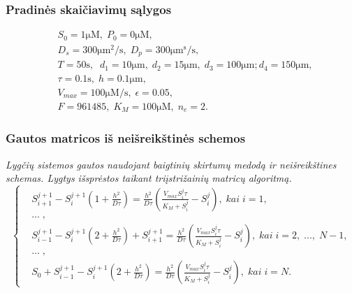 \documentclass[12pt, a4paper, lithuanian]{article}
\begin{document}
\subsubsection{Pradinės skaičiavimų sąlygos}

\begin{equation}
\begin{aligned}
    &S_0 = 1 \mathrm{\mu M},\; P_0 = 0 \mathrm{\mu M},\\
    &D_s = 300 \mathrm{\mu m^2/s},\; D_p = 300 \mathrm{\mu m^s/s},\\
    &T = 50\mathrm{s},\;\; d_1 = 10 \mathrm{\mu m},\; d_2 = 15\mathrm{\mu m},\; d_3 = 100\mathrm{\mu m}; d_4 =
    150\mathrm{\mu m},\\
    &\tau = 0.1\mathrm{s},\; h=0.1 \mathrm{\mu m},\\
    &V_{max} = 100\mathrm{\mu M /s},\; \epsilon = 0.05,\\
    &F=961485,\; K_M= 100\mathrm{\mu M},\; n_e = 2.
\end{aligned}
\end{equation}

\subsubsection{Gautos matricos iš neišreikštinės schemos}
\textit{Lygčių sistemos gautos naudojant baigtinių skirtumų medodą ir neišreikštines schemas. Lygtys išsprėstos taikant triįstrižainių matricų algoritmą.}
\begin{equation}
\left\{
\begin{aligned}
    &S_{i+1}^{j+1}-S_i^{j+1}\left(1+\frac{h^2}{D\tau}\right)
= \frac{h^2}{D\tau} \left(\frac{V_{max}S_i^j\tau}{K_M+S_i^j}-S_i^j\right),\; kai \; i = 1,\\
    &\dots\;,\\
    &S_{i-1}^{j+1}-S_i^{j+1}\left(2+\frac{h^2}{D\tau}\right)+S_{i+1}^{j+1}
        = \frac{h^2}{D\tau}
        \left(\frac{V_{max}S_i^j\tau}{K_M+S_i^j}-S_i^j\right),\; kai\; i =
        2,\;...,\;N-1,\\
    &\dots\;,\\
    &S_0 + S_{i-1}^{j+1} - S_i^{j+1}\left(2+\frac{h^2}{D\tau}\right)
        =  \frac{h^2}{D\tau}
    \left(\frac{V_{max}S_i^j\tau}{K_M+S_i^j}-S_i^j\right),\; kai \; i = N.
\end{aligned}
\right.
\end{equation}
\end{document}
